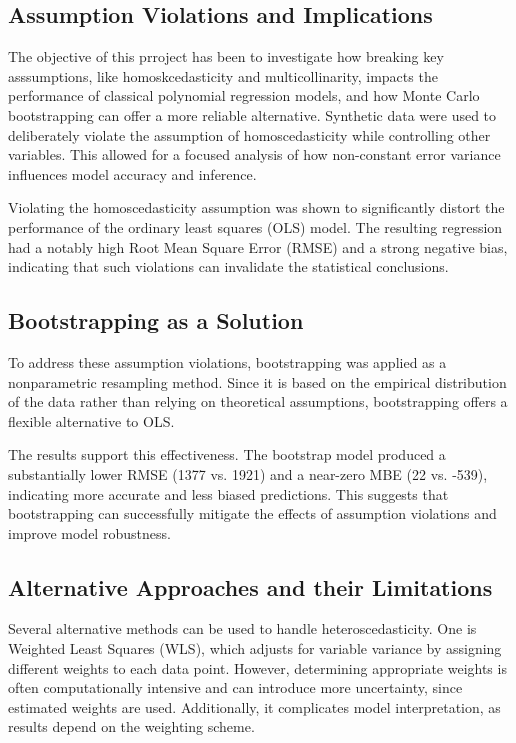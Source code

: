 \subsection{Assumption Violations and Implications}
The objective of this prroject has been to investigate how breaking key asssumptions, like homoskcedasticity and multicollinarity, impacts the performance of classical polynomial regression models, and how Monte Carlo bootstrapping can offer a more reliable alternative. Synthetic data were used to deliberately violate the assumption of homoscedasticity while controlling other variables. This allowed for a focused analysis of how non-constant error variance influences model accuracy and inference.

\noindent Violating the homoscedasticity assumption was shown to significantly distort the performance of the ordinary least squares (OLS) model. The resulting regression had a notably high Root Mean Square Error (RMSE) and a strong negative bias, indicating that such violations can invalidate the statistical conclusions. 

\subsection{Bootstrapping as a Solution}
To address these assumption violations, bootstrapping was applied as a nonparametric resampling method. Since it is based on the empirical distribution of the data rather than relying on theoretical assumptions, bootstrapping offers a flexible alternative to OLS.

\noindent The results support this effectiveness. The bootstrap model produced a substantially lower RMSE (1377 vs. 1921) and a near-zero MBE (22 vs. -539), indicating more accurate and less biased predictions. This suggests that bootstrapping can successfully mitigate the effects of assumption violations and improve model robustness.

\subsection{Alternative Approaches and their Limitations}
Several alternative methods can be used to handle heteroscedasticity. One is Weighted Least Squares (WLS), which adjusts for variable variance by assigning different weights to each data point. However, determining appropriate weights is often computationally intensive and can introduce more uncertainty, since estimated weights are used. Additionally, it complicates model interpretation, as results depend on the weighting scheme.

